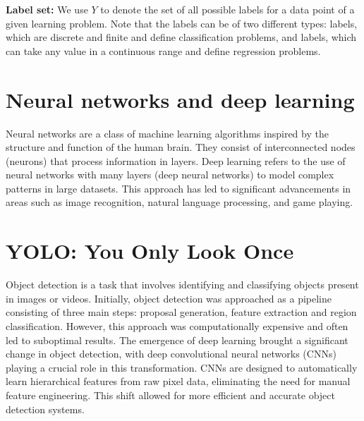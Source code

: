 \textbf{Label set: } We use \( Y \) to denote the set of all possible labels for a data point of a given learning problem. Note that the labels can be of two different types:  labels, which are discrete and finite and define classification problems, and  labels, which can take any value in a continuous range and define regression problems.

\section{Neural networks and deep learning} 
Neural networks are a class of machine learning algorithms inspired by the structure and function of the human brain. They consist of interconnected nodes (neurons) that process information in layers. Deep learning refers to the use of neural networks with many layers (deep neural networks) to model complex patterns in large datasets. This approach has led to significant advancements in areas such as image recognition, natural language processing, and game playing.

\section{YOLO: You Only Look Once \cite{yolov8_ultralytics}}
Object detection is a task that involves identifying and classifying objects present in images or videos. Initially, object detection was approached as a pipeline consisting of three main steps: proposal generation, feature extraction and region classification. However, this approach was computationally expensive and often led to suboptimal results.
The emergence of deep learning brought a significant change in object detection, with deep convolutional neural networks (CNNs) playing a crucial role in this transformation. CNNs are designed to automatically learn hierarchical features from raw pixel data, eliminating the need for manual feature engineering. This shift allowed for more efficient and accurate object detection systems.

